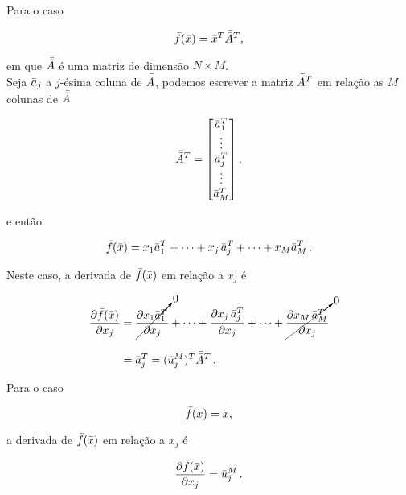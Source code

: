 \begin{example}
    Para o caso

    \begin{equation}
    \bar{f}(\bar{x}) = \bar{x}^T\bar{\bar{A}}^T  ,
    \end{equation}

    \noindent em que $\bar{\bar{A}}$ é uma matriz de dimensão $N \times M$.
    \\
    \indent
    Seja $\bar{a}_j$ a $j$-ésima coluna de $\bar{\bar{A}}$, podemos escrever a matriz
    $\bar{\bar{A}}^T$ em relação as $M$ colunas de $\bar{\bar{A}}$

    \begin{equation}
    \bar{\bar{A}}^T =
        \begin{bmatrix}
        \bar{a}_1^T \\ \vdots \\ \bar{a}_j^T \\ \vdots \\ \bar{a}_M^T
        \end{bmatrix} ,
    \end{equation}

    \noindent e então

    \begin{equation}
    \bar{f}(\bar{x}) = x_1\bar{a}_1^T + \dotsb + x_j\thinspace\bar{a}_j^T +
    \dotsb + x_M\bar{a}_M^T \thinspace .
    \end{equation}

    \indent Neste caso, a derivada de  $\bar{f}(\bar{x})$ em relação
    a $x_j$ é
    
    \begin{equation}
    \begin{split}
    \dfrac{\partial \bar{f}(\bar{x})}{\partial x_j} &=
        \cancelto{0}{\dfrac{\partial x_1\bar{a}_1^T}{\partial x_j}} + \dotsb +
        \dfrac{\partial x_j\thinspace\bar{a}_j^T}{\partial x_j} + \dotsb +
        \cancelto{0}{\dfrac{\partial x_M\thinspace\bar{a}_M^T}{\partial x_j}}
    \\[0.3cm]
    &=
    \bar{a}_j^T = (\bar{u}_j^M)^T \bar{\bar{A}}^T
    \thinspace .
    \end{split}
    \label{eq:deriv_xTAT}
    \end{equation}
\end{example}

\begin{example}
    Para o caso

    \begin{equation}
    \bar{f}(\bar{x}) = \bar{x} ,
    \end{equation}
    
    \noindent a derivada de  $\bar{f}(\bar{x})$ em relação
    a $x_j$ é
    
    \begin{equation}
    \dfrac{\partial \bar{f}(\bar{x})}{\partial x_j} = \bar{u}_j^M
    \thinspace .
    \end{equation}
\end{example}

